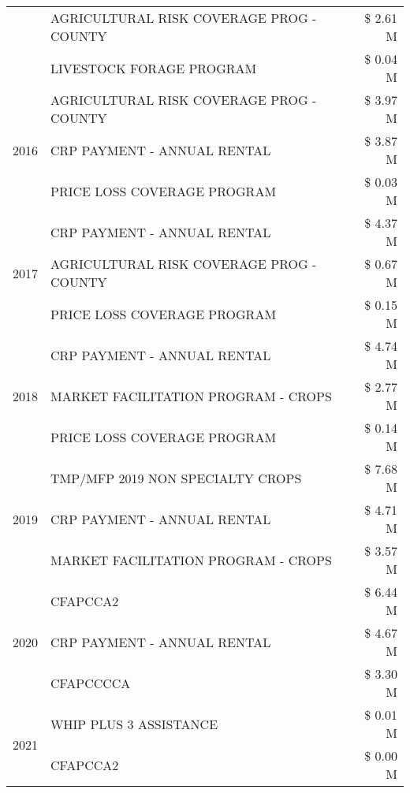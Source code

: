 \begin{tabular}{llr}
 & AGRICULTURAL RISK COVERAGE PROG - COUNTY & \$ 2.61 M \\
 & LIVESTOCK FORAGE PROGRAM & \$ 0.04 M \\
\cline{1-3}
\multirow[t]{3}{*}{2016} & AGRICULTURAL RISK COVERAGE PROG - COUNTY & \$ 3.97 M \\
 & CRP PAYMENT - ANNUAL RENTAL & \$ 3.87 M \\
 & PRICE LOSS COVERAGE PROGRAM & \$ 0.03 M \\
\cline{1-3}
\multirow[t]{3}{*}{2017} & CRP PAYMENT - ANNUAL RENTAL & \$ 4.37 M \\
 & AGRICULTURAL RISK COVERAGE PROG - COUNTY & \$ 0.67 M \\
 & PRICE LOSS COVERAGE PROGRAM & \$ 0.15 M \\
\cline{1-3}
\multirow[t]{3}{*}{2018} & CRP PAYMENT - ANNUAL RENTAL & \$ 4.74 M \\
 & MARKET FACILITATION PROGRAM - CROPS & \$ 2.77 M \\
 & PRICE LOSS COVERAGE PROGRAM & \$ 0.14 M \\
\cline{1-3}
\multirow[t]{3}{*}{2019} & TMP/MFP 2019 NON SPECIALTY CROPS & \$ 7.68 M \\
 & CRP PAYMENT - ANNUAL RENTAL & \$ 4.71 M \\
 & MARKET FACILITATION PROGRAM - CROPS & \$ 3.57 M \\
\cline{1-3}
\multirow[t]{3}{*}{2020} & CFAPCCA2 & \$ 6.44 M \\
 & CRP PAYMENT - ANNUAL RENTAL & \$ 4.67 M \\
 & CFAPCCCCA & \$ 3.30 M \\
\cline{1-3}
\multirow[t]{2}{*}{2021} & WHIP PLUS 3 ASSISTANCE & \$ 0.01 M \\
 & CFAPCCA2 & \$ 0.00 M \\
\cline{1-3}
\bottomrule
\end{tabular}
